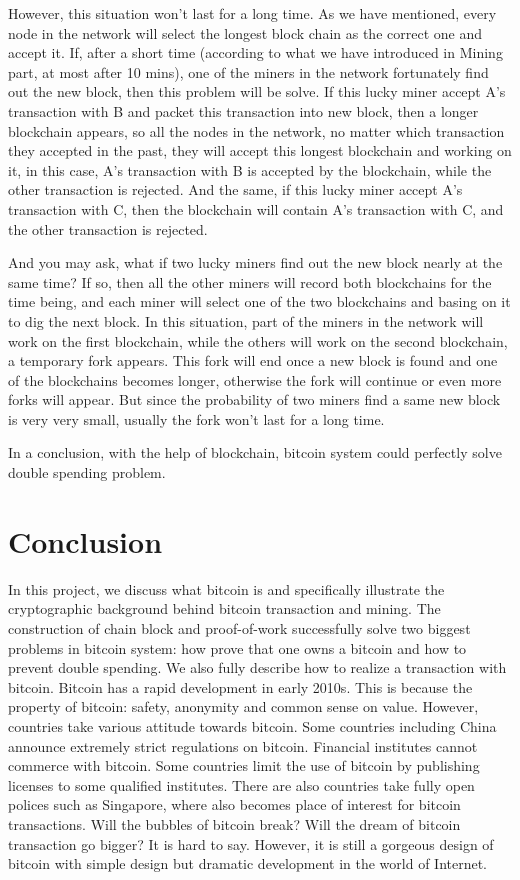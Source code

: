 \documentclass[12pt,a4paper]{article}
\begin{document}
 However, this situation won't last for a long time. As we have mentioned, every node in the network will select the longest block chain as the correct one and accept it. If, after a short time (according to what we have introduced in Mining part, at most after 10 mins), one of the miners in the network fortunately find out the new block, then this problem will be solve. If this lucky miner accept A's transaction with B and packet this transaction into new block, then a longer blockchain appears, so all the nodes in the network, no matter which transaction they accepted in the past, they will accept this longest blockchain and working on it, in this case, A's transaction with B is accepted by the blockchain, while the other transaction is rejected. And the same, if this lucky miner accept A's transaction with C, then the blockchain will contain A's transaction with C, and the other transaction is rejected.
 
 And you may ask, what if two lucky miners find out the new block nearly at the same time? If so, then all the other miners will record both blockchains for the time being, and each miner will select one of the two blockchains and basing on it to dig the next block. In this situation, part of the miners in the network will work on the first blockchain, while the others will work on the second blockchain, a temporary fork appears. This fork will end once a new block is found and one of the blockchains becomes longer, otherwise the fork will continue or even more forks will appear. But since the probability of two miners find a same new block is very very small, usually the fork won't last for a long time.
 
 In a conclusion, with the help of blockchain, bitcoin system could perfectly solve double spending problem.


\section{Conclusion}
In this project, we discuss what bitcoin is and specifically illustrate the cryptographic background behind bitcoin transaction and mining. The construction of chain block and proof-of-work successfully solve two biggest problems in bitcoin system: how prove that one owns a bitcoin and how to prevent double spending. We also fully describe how to realize a transaction with bitcoin. Bitcoin has a rapid development in early 2010s.  This is because the property of bitcoin: safety, anonymity and common sense on value. However, countries take various attitude towards bitcoin. Some countries including China announce extremely strict regulations on bitcoin. Financial institutes cannot commerce with bitcoin. Some countries limit the use of bitcoin by publishing licenses to some qualified institutes. There are also countries take fully open polices such as Singapore, where also becomes place of interest for bitcoin transactions. Will the bubbles of bitcoin break? Will the dream of bitcoin transaction go bigger? It is hard to say. However, it is still a gorgeous design of bitcoin with simple design but dramatic development in the world of Internet.
\end{document}
